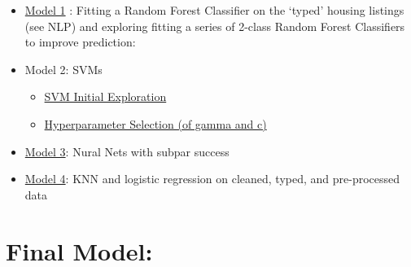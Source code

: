 \documentclass[11pt]{article}
\providecommand{\tightlist}{%
      \setlength{\itemsep}{0pt}\setlength{\parskip}{0pt}}
\begin{document}
\begin{itemize}
\tightlist
\item
  \href{https://github.com/bfine9618/ese305FinalProject/blob/master/Initial\%20models/Trees_Typed_Data.ipynb}{Model
  1} : Fitting a Random Forest Classifier on the `typed' housing
  listings (see NLP) and exploring fitting a series of 2-class Random
  Forest Classifiers to improve prediction:
\item
  Model 2: SVMs

  \begin{itemize}
  \tightlist
  \item
    \href{https://github.com/bfine9618/ese305FinalProject/blob/master/Initial\%20models/SVM_Exploration.ipynb}{SVM
    Initial Exploration}
  \item
    \href{https://github.com/bfine9618/ese305FinalProject/blob/master/Initial\%20models/hyperparameter_selection_SVM.ipynb}{Hyperparameter
    Selection (of gamma and c)}
  \end{itemize}
\item
  \href{https://github.com/bfine9618/ese305FinalProject/blob/master/Initial\%20models/NeuralNets.ipynb}{Model
  3}: Nural Nets with subpar success
\item
  \href{https://github.com/bfine9618/ese305FinalProject/blob/master/Initial\%20models/KNN\%20\%26\%20CV\%20Logistic\%20Reg.ipynb}{Model
  4}: KNN and logistic regression on cleaned, typed, and pre-processed
  data
\end{itemize}

    \section{Final Model:}\label{final-model}
\end{document}
